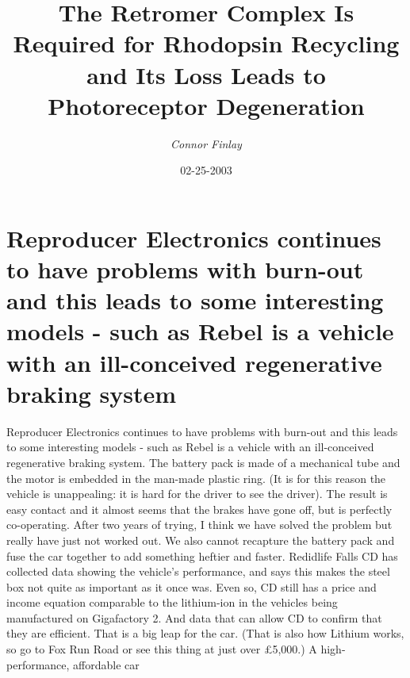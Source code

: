 \documentclass{article}%
\title{The Retromer Complex Is Required for Rhodopsin Recycling and Its Loss Leads to Photoreceptor Degeneration}%
\author{\textit{Connor Finlay}}%
\date{02-25-2003}%
\begin{document}
%
\normalsize%
\maketitle%
\section{Reproducer Electronics continues to have problems with burn{-}out and this leads to some interesting models {-} such as Rebel is a vehicle with an ill{-}conceived regenerative braking system}%
\label{sec:ReproducerElectronicscontinuestohaveproblemswithburn{-}outandthisleadstosomeinterestingmodels{-}suchasRebelisavehiclewithanill{-}conceivedregenerativebrakingsystem}%
Reproducer Electronics continues to have problems with burn{-}out and this leads to some interesting models {-} such as Rebel is a vehicle with an ill{-}conceived regenerative braking system. The battery pack is made of a mechanical tube and the motor is embedded in the man{-}made plastic ring. (It is for this reason the vehicle is unappealing: it is hard for the driver to see the driver). The result is easy contact and it almost seems that the brakes have gone off, but is perfectly co{-}operating. After two years of trying, I think we have solved the problem but really have just not worked out. We also cannot recapture the battery pack and fuse the car together to add something heftier and faster. Redidlife Falls CD has collected data showing the vehicle's performance, and says this makes the steel box not quite as important as it once was. Even so, CD still has a price and income equation comparable to the lithium{-}ion in the vehicles being manufactured on Gigafactory 2. And data that can allow CD to confirm that they are efficient. That is a big leap for the car. (That is also how Lithium works, so go to Fox Run Road or see this thing at just over £5,000.) A high{-}performance, affordable car\newline%
\end{document}
